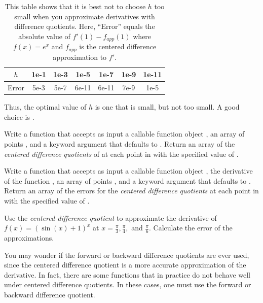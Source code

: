 \begin{table}
\begin{center}
\begin{tabular}{|c|c|c|c|c|c|c|}
    \hline
    $h$     & 1e-1 & 1e-3 & 1e-5  & 1e-7  & 1e-9 & 1e-11 \\ \hline
    Error   & 5e-3 & 5e-7 & 6e-11 & 6e-11 & 7e-9 & 1e-5  \\ \hline
\end{tabular}
\caption{This table shows that it is best not to choose $h$ too small when you approximate derivatives with difference quotients.
Here, ``Error'' equals the absolute value of $f'(1)-f_{app}(1)$ where $f(x) = e^x$ and $f_{app}$ is the centered difference approximation to $f'$.}
\label{table:approx_errors}
\end{center}
\end{table}

Thus, the optimal value of $h$ is one that is small, but not too small. A good choice is .

\begin{problem}
Write a function that accepts as input a callable function object , an array of points , and
a keyword argument  that defaults to .
Return an array of the \emph{centered difference quotients} of  at each point in  with the specified value of .
\end{problem}

\begin{problem}
Write a function that accepts as input a callable function object , the derivative  of the function , an array of points , and
a keyword argument  that defaults to .  Return an array of the errors for the \emph{centered difference quotients} at each point in  with the specified value of .
\end{problem}

\begin{problem}
Use the \emph{centered difference quotient} to approximate the derivative of $f(x) = (\sin(x)+1)^x$ at $x = \frac{\pi}{3}, \frac{\pi}{4},$ and $\frac{\pi}{6}$.  Calculate the error of the approximations.
\end{problem}

You may wonder if the forward or backward difference quotients are ever used, since the centered difference quotient is a more accurate approximation of the derivative.
In fact, there are some functions that in practice do not behave well under centered difference quotients.
In these cases, one must use the forward or backward difference quotient.

